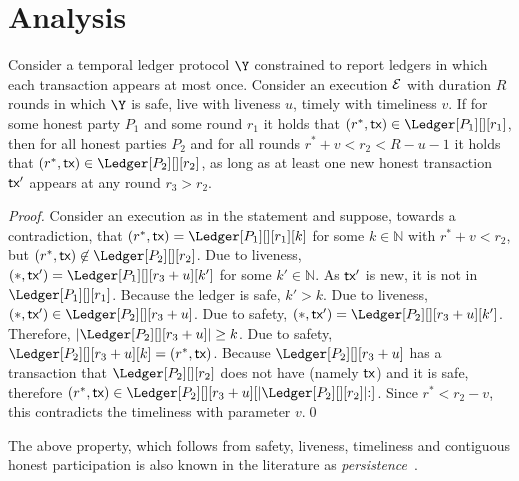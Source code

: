 \section{Analysis}

\begin{lemma}
  Consider a temporal ledger protocol $\Y$
  constrained to report ledgers in which each transaction appears at most once.
  Consider an execution $\mathcal{E}$ with duration $R$ rounds in which $\Y$ is
  safe, live with liveness $u$, timely with timeliness $v$.
  If for some honest party $P_1$ and some round $r_1$ it holds that
  $(r^*, \tx) \in \Ledger[P_1][][r_1]$, then
  for all honest parties $P_2$ and for all rounds $r^* + v < r_2 < R - u - 1$
  it holds that
  $(r^*, \tx) \in \Ledger[P_2][][r_2]$,
  as long as at least one new honest transaction $\textsf{tx}'$ appears at
  any round $r_3 > r_2$.
\end{lemma}
\begin{proof}
  Consider an execution as in the statement and suppose, towards a contradiction,
  that $(r^*, \tx) = \Ledger[P_1][][r_1][k]$ for some $k \in \mathbb{N}$
  with $r^* + v < r_2$, but
  $(r^*, \tx) \not\in \Ledger[P_2][][r_2]$.
  Due to liveness,
  $(*, \tx') = \Ledger[P_1][][r_3 + u][k']$ for some $k' \in \mathbb{N}$.
  As $\textsf{tx}'$ is new, it is not in $\Ledger[P_1][][r_1]$.
  Because the ledger is safe, $k' > k$.
  Due to liveness, $(*, \tx') \in \Ledger[P_2][][r_3 + u]$.
  Due to safety, $(*, \tx') = \Ledger[P_2][][r_3 + u][k']$.
  Therefore, $|\Ledger[P_2][][r_3 + u]| \geq k$.
  Due to safety, $\Ledger[P_2][][r_3 + u][k] = (r^*, \tx)$.
  Because $\Ledger[P_2][][r_3 + u]$ has a transaction
  that $\Ledger[P_2][][r_2]$ does not have (namely $\textsf{tx}$)
  and it is safe, therefore
  $(r^*, \tx) \in \Ledger[P_2][][r_3 + u][|\Ledger[P_2][][r_2]|{:}]$.
  Since $r^* < r_2 - v$, this contradicts the timeliness with parameter $v$.\qed
\end{proof}

The above property, which follows from safety, liveness, timeliness and
contiguous honest participation is also known in the literature as
\emph{persistence}~\cite{backbone}.

%
%


